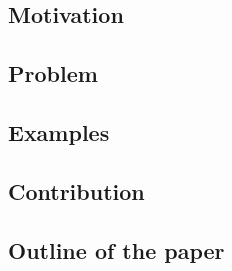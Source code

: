 
\subsection{Motivation}

\subsection{Problem}

\subsection{Examples}

\subsection{Contribution}

\subsection{Outline of the paper}

